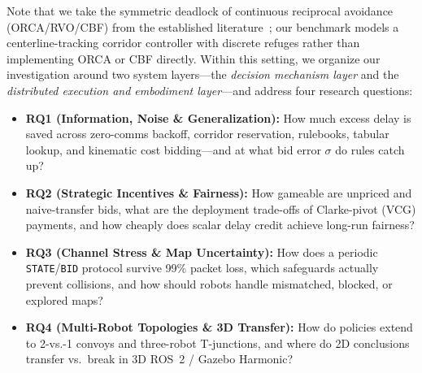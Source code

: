 \documentclass[letterpaper,journal]{IEEEtran}
\begin{document}
Note that we take the symmetric deadlock of continuous reciprocal avoidance (ORCA/RVO/CBF) from the established literature~\cite{grover2023before,dergachev2021distributed,chandra2025deadlock}; our benchmark models a centerline-tracking corridor controller with discrete refuges rather than implementing ORCA or CBF directly. Within this setting, we organize our investigation around two system layers---the \emph{decision mechanism layer} and the \emph{distributed execution and embodiment layer}---and address four research questions:
\begin{itemize}
\item \textbf{RQ1 (Information, Noise \& Generalization):} How much excess delay is saved across zero-comms backoff, corridor reservation, rulebooks, tabular lookup, and kinematic cost bidding---and at what bid error $\sigma$ do rules catch up?
\item \textbf{RQ2 (Strategic Incentives \& Fairness):} How gameable are unpriced and naive-transfer bids, what are the deployment trade-offs of Clarke-pivot (VCG) payments, and how cheaply does scalar delay credit achieve long-run fairness?
\item \textbf{RQ3 (Channel Stress \& Map Uncertainty):} How does a periodic \texttt{STATE}/\texttt{BID} protocol survive 99\% packet loss, which safeguards actually prevent collisions, and how should robots handle mismatched, blocked, or explored maps?
\item \textbf{RQ4 (Multi-Robot Topologies \& 3D Transfer):} How do policies extend to 2-vs.-1 convoys and three-robot T-junctions, and where do 2D conclusions transfer vs.\ break in 3D ROS~2 / Gazebo Harmonic?
\end{itemize}
\end{document}
